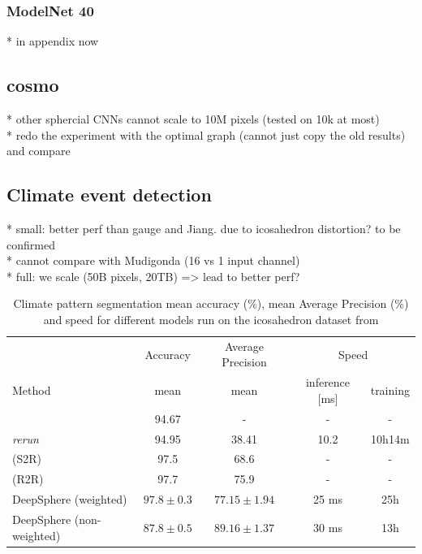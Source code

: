 \documentclass{article} %
\begin{document}
\subsubsection*{ModelNet 40}
* in appendix now\\

\subsection{cosmo}

* other sphercial CNNs cannot scale to 10M pixels (tested on 10k at most) \\
* redo the experiment with the optimal graph (cannot just copy the old results) and compare \\

\subsection{Climate event detection}

* small: better perf than gauge and Jiang. due to icosahedron distortion? to be confirmed\\
* cannot compare with Mudigonda (16 vs 1 input channel)\\
* full: we scale (50B pixels, 20TB) => lead to better perf?\\

\begin{table}[!ht]
\begin{tabular}{l|c c c c}
        \multicolumn{1}{l}{} & Accuracy & Average Precision & \multicolumn{2}{c}{Speed}\\
        \cmidrule(lr){2-2} \cmidrule(lr){3-3} \cmidrule(lr){4-5} 
        \multicolumn{1}{l}{Method} & mean & mean & inference [ms] & training \\ \hline
        \cite{jiang_spherical_2019} & 94.67 & - & - & -\\
        \cite{jiang_spherical_2019} \emph{rerun} & 94.95 & 38.41 & 10.2 & 10h14m\\
        \cite{cohen_gauge_2019} (S2R) & 97.5 & 68.6 & - & -\\
        \cite{cohen_gauge_2019} (R2R) & 97.7 & 75.9 & - & -\\ \hline
        DeepSphere (weighted) & $97.8\pm 0.3$ & $77.15\pm 1.94$ & 25 ms & 25h \\
        DeepSphere (non-weighted) & $87.8\pm 0.5$ & $89.16\pm 1.37$ & 30 ms & 13h\\
    \end{tabular}
    \caption{Climate pattern segmentation mean accuracy (\%), mean Average Precision (\%) and speed for different models run on the icosahedron dataset from \cite{jiang_spherical_2019}}
\end{table}
\end{document}
